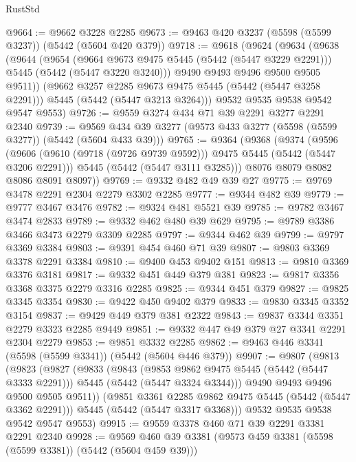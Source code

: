 \begin{lexlean}{RustStd}
\begin{coremodule}
{\begin{coremodule}
{{{{{{{{{{{{@9664 := @9662 @3228 @2285
@9673 := @9463 @420 @3237 (@5598 (@5599 @3237)) (@5442 (@5604 @420 @379))
@9718 := @9618
    (@9624
      (@9634
        (@9638
          (@9644
            (@9654
              (@9664 @9673 @9475 @5445 (@5442 (@5447 @3229 @2291)))
              @5445
              (@5442 (@5447 @3220 @3240)))
            @9490
            @9493
            @9496
            @9500
            @9505
            @9511))
        (@9662 @3257 @2285 @9673 @9475 @5445 (@5442 (@5447 @3258 @2291)))
        @5445
        (@5442 (@5447 @3213 @3264)))
      @9532
      @9535
      @9538
      @9542
      @9547
      @9553)
@9726 := @9559 @3274 @434 @71 @39 @2291 @3277 @2291 @2340
@9739 := @9569 @434 @39 @3277 (@9573 @433 @3277 (@5598 (@5599 @3277)) (@5442 (@5604 @433 @39)))
@9765 := @9364
    (@9368
      (@9374
        (@9596
          (@9606 (@9610 (@9718 (@9726 @9739 @9592))) @9475 @5445 (@5442 (@5447 @3206 @2291)))
          @5445
          (@5442 (@5447 @3111 @3285)))
        @8076
        @8079
        @8082
        @8086
        @8091
        @8097))
@9769 := @9332 @482 @49 @39 @27
@9775 := @9769 @3478 @2291 @2304 @2279 @3302 @2285
@9777 := @9344 @482 @39
@9779 := @9777 @3467 @3476
@9782 := @9324 @481 @5521 @39
@9785 := @9782 @3467 @3474 @2833
@9789 := @9332 @462 @480 @39 @629
@9795 := @9789 @3386 @3466 @3473 @2279 @3309 @2285
@9797 := @9344 @462 @39
@9799 := @9797 @3369 @3384
@9803 := @9391 @454 @460 @71 @39
@9807 := @9803 @3369 @3378 @2291 @3384
@9810 := @9400 @453 @9402 @151
@9813 := @9810 @3369 @3376 @3181
@9817 := @9332 @451 @449 @379 @381
@9823 := @9817 @3356 @3368 @3375 @2279 @3316 @2285
@9825 := @9344 @451 @379
@9827 := @9825 @3345 @3354
@9830 := @9422 @450 @9402 @379
@9833 := @9830 @3345 @3352 @3154
@9837 := @9429 @449 @379 @381 @2322
@9843 := @9837 @3344 @3351 @2279 @3323 @2285 @9449
@9851 := @9332 @447 @49 @379 @27 @3341 @2291 @2304 @2279
@9853 := @9851 @3332 @2285
@9862 := @9463 @446 @3341 (@5598 (@5599 @3341)) (@5442 (@5604 @446 @379))
@9907 := @9807
    (@9813
      (@9823
        (@9827
          (@9833
            (@9843
              (@9853 @9862 @9475 @5445 (@5442 (@5447 @3333 @2291)))
              @5445
              (@5442 (@5447 @3324 @3344)))
            @9490
            @9493
            @9496
            @9500
            @9505
            @9511))
        (@9851 @3361 @2285 @9862 @9475 @5445 (@5442 (@5447 @3362 @2291)))
        @5445
        (@5442 (@5447 @3317 @3368)))
      @9532
      @9535
      @9538
      @9542
      @9547
      @9553)
@9915 := @9559 @3378 @460 @71 @39 @2291 @3381 @2291 @2340
@9928 := @9569 @460 @39 @3381 (@9573 @459 @3381 (@5598 (@5599 @3381)) (@5442 (@5604 @459 @39)))
}}}}}}}}}}}}
\end{coremodule}}
\end{coremodule}
\end{lexlean}
